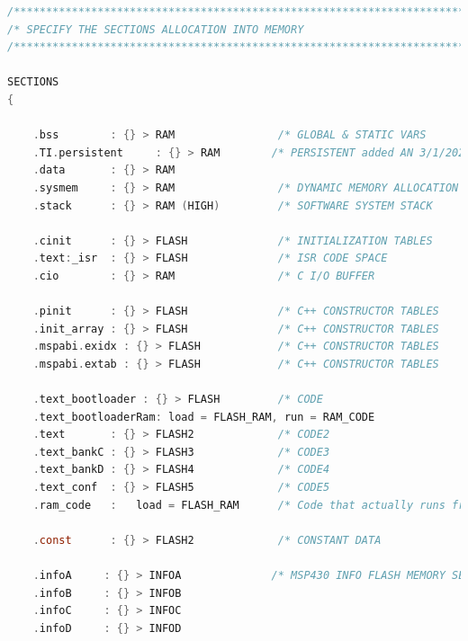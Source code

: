 \documentclass[LaM,binding=0.6cm]{../sapthesis}
\begin{document}
\begin{lstlisting}[language=C]
/****************************************************************************/
/* SPECIFY THE SECTIONS ALLOCATION INTO MEMORY                              */
/****************************************************************************/

SECTIONS
{

    .bss        : {} > RAM                /* GLOBAL & STATIC VARS              */
    .TI.persistent     : {} > RAM        /* PERSISTENT added AN 3/1/2021    */
    .data       : {} > RAM
    .sysmem     : {} > RAM                /* DYNAMIC MEMORY ALLOCATION AREA    */
    .stack      : {} > RAM (HIGH)         /* SOFTWARE SYSTEM STACK             */

	.cinit      : {} > FLASH              /* INITIALIZATION TABLES             */
	.text:_isr  : {} > FLASH              /* ISR CODE SPACE                    */
    .cio        : {} > RAM                /* C I/O BUFFER                      */

    .pinit      : {} > FLASH              /* C++ CONSTRUCTOR TABLES            */
    .init_array : {} > FLASH              /* C++ CONSTRUCTOR TABLES            */
    .mspabi.exidx : {} > FLASH            /* C++ CONSTRUCTOR TABLES            */
    .mspabi.extab : {} > FLASH            /* C++ CONSTRUCTOR TABLES            */

    .text_bootloader : {} > FLASH		  /* CODE                              */
    .text_bootloaderRam: load = FLASH_RAM, run = RAM_CODE
    .text       : {} > FLASH2			  /* CODE2                             */
    .text_bankC : {} > FLASH3		      /* CODE3                             */
    .text_bankD : {} > FLASH4		      /* CODE4                             */
    .text_conf  : {} > FLASH5		  	  /* CODE5                             */
    .ram_code	:	load = FLASH_RAM	  /* Code that actually runs from RAM  */

    .const      : {} > FLASH2     		  /* CONSTANT DATA                     */

    .infoA     : {} > INFOA              /* MSP430 INFO FLASH MEMORY SEGMENTS */
    .infoB     : {} > INFOB
    .infoC     : {} > INFOC
    .infoD     : {} > INFOD




\end{lstlisting}
\end{document}
